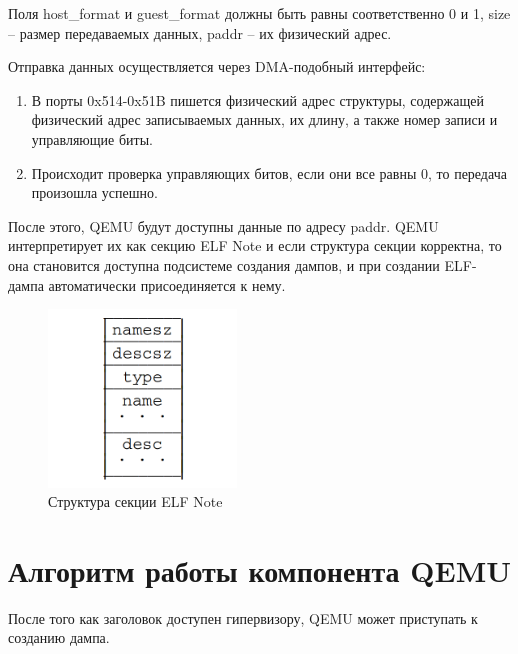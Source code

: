 \documentclass{mipt-thesis-bs}
\begin{document}
Поля host{\_}format и guest{\_}format должны быть равны соответственно 0 и 1, size -- размер передаваемых данных, paddr -- их физический адрес. 

Отправка данных осуществляется через DMA-подобный интерфейс:

\begin{enumerate}
\item В порты 0x514-0x51B пишется физический адрес структуры, содержащей физический адрес записываемых данных, их длину, а также номер записи и управляющие биты.
\item Происходит проверка управляющих битов, если они все равны 0, то передача произошла успешно.
\end{enumerate}

После этого, QEMU будут доступны данные по адресу paddr. QEMU интерпретирует их как секцию ELF Note и если структура секции корректна, то она становится доступна подсистеме создания дампов, и при создании ELF-дампа автоматически присоединяется к нему.

\begin{figure}[h]
\begin{center}
    \includegraphics[width=5cm]{note.png}
    \caption{Структура секции ELF Note}
\end{center}
\end{figure}

\section*{Алгоритм работы компонента QEMU}

После того как заголовок доступен гипервизору, QEMU может приступать к созданию дампа.
\end{document}
